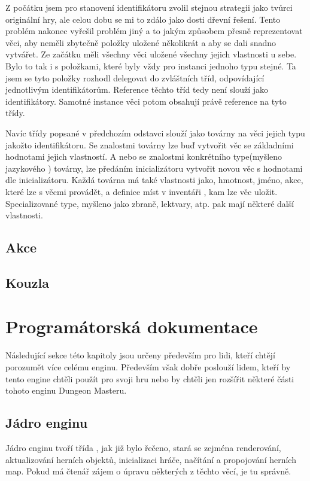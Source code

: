 Z počátku jsem pro stanovení identifikátoru zvolil stejnou strategii jako tvůrci originální hry, ale celou dobu se mi 
to zdálo jako dosti dřevní řešení. Tento problém nakonec vyřešil problém jiný a to jakým způsobem přesně reprezentovat věci, aby neměli zbytečně
položky uložené několikrát a aby se dali snadno vytvářet. Ze začátku měli všechny věci uložené 
všechny jejich vlastnosti u sebe. Bylo to tak i s položkami, které byly vždy pro instanci jednoho typu stejné. Ta jsem se
tyto položky rozhodl delegovat do zvláštních tříd, odpovídající jednotlivým identifikátorům. Reference těchto tříd
tedy není slouží jako identifikátory. Samotné instance věci potom obsahují právě reference na tyto třídy.

Navíc třídy popsané v předchozím odstavci slouží jako továrny na věci jejich typu jakožto identifikátoru. Se znalostmi továrny lze buď
vytvořit věc se základními hodnotami jejich vlastností. A nebo se znalostmi konkrétního type(myšleno jazykového ) továrny, lze předáním inicializátoru vytvořit novou věc
s hodnotami dle inicializátoru. Každá továrna má také vlastnosti jako, hmotnost, jméno, akce, které lze s věcmi provádět, a definice míst v inventáři
, kam lze věc uložit. Specializované type, myšleno jako zbraně, lektvary, atp. pak mají některé další vlastnosti.

\section{Akce}

\section{Kouzla}

\chapter{Programátorská dokumentace}
Následující sekce této kapitoly jsou určeny především pro lidi, kteří chtějí porozumět více celému enginu. Především
však dobře poslouží lidem, kteří by tento engine chtěli použít pro svoji hru nebo by chtěli jen rozšířit některé části
tohoto enginu Dungeon Masteru.

\section{Jádro enginu}
Jádro enginu tvoří třída , jak již bylo řečeno, stará se zejména renderování, aktualizování herních objektů,
inicializaci hráče, načítání a propojování herních map. Pokud má čtenář zájem o úpravu některých z těchto věcí, je tu správně.


